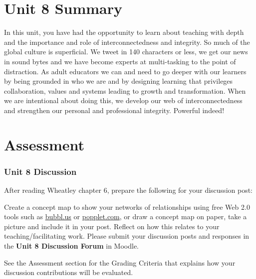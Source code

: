 \documentclass[
]{book}
\providecommand{\tightlist}{%
  \setlength{\itemsep}{0pt}\setlength{\parskip}{0pt}}
\begin{document}
\hypertarget{unit-8-summary}{%
\section*{Unit 8 Summary}\label{unit-8-summary}}

In this unit, you have had the opportunity to learn about teaching with depth and the importance and role of interconnectedness and integrity. So much of the global culture is superficial. We tweet in 140 characters or less, we get our news in sound bytes and we have become experts at multi-tasking to the point of distraction. As adult educators we can and need to go deeper with our learners by being grounded in who we are and by designing learning that privileges collaboration, values and systems leading to growth and transformation. When we are intentional about doing this, we develop our web of interconnectedness and strengthen our personal and professional integrity. Powerful indeed!

\hypertarget{assessment-7}{%
\section*{Assessment}\label{assessment-7}}

\begin{assessment}
\hypertarget{unit-8-discussion}{%
\subsubsection*{Unit 8 Discussion}\label{unit-8-discussion}}

After reading Wheatley chapter 6, prepare the following for your
discussion post:


Create a concept map to show your networks of relationships using free
Web 2.0 tools such as \href{https://bubbl.us/}{bubbl.us} or
\href{http://popplet.com/}{popplet.com}, or draw a concept map on paper,
take a picture and include it in your post. Reflect on how this relates
to your teaching/facilitating work. Please submit your discussion posts
and responses in the \textbf{Unit 8 Discussion Forum} in Moodle.

See the Assessment section for the Grading Criteria that explains how
your discussion contributions will be evaluated.
\end{assessment}
\end{document}
